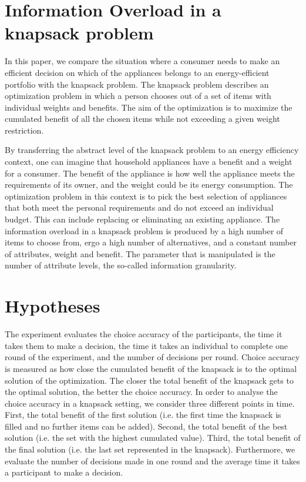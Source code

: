 \section{Information Overload in a knapsack problem}
\label{ch:Literature Review:sec:Information Overload in a knapsack problem}
In this paper, we compare the situation where a consumer needs to make an efficient decision on which of the appliances belongs to an energy-efficient portfolio with the knapsack problem. The knapsack problem describes an optimization problem in which a person chooses out of a set of items with individual weights and benefits. The aim of the optimization is to maximize the cumulated benefit of all the chosen items while not exceeding a given weight restriction.

By transferring the abstract level of the knapsack problem to an energy efficiency context, one can imagine that household appliances have a benefit and a weight for a consumer. The benefit of the appliance is how well the appliance meets the requirements of its owner, and the weight could be its energy consumption. The optimization problem in this context is to pick the best selection of appliances that both meet the personal requirements and do not exceed an individual budget. This can include replacing or eliminating an existing appliance.
The information overload in a knapsack problem is produced by a high number of items to choose from, ergo a high number of alternatives, and a constant number of attributes, weight and benefit. The parameter that is manipulated is the number of attribute levels, the so-called information granularity.

\section{Hypotheses}
\label{ch:Literature Review:sec:Hypotheses}
The experiment evaluates the choice accuracy of the participants, the time it takes them to make a decision, the time it takes an individual to complete one round of the experiment, and the number of decisions per round.
Choice accuracy is measured as how close the cumulated benefit of the knapsack is to the optimal solution of the optimization. The closer the total benefit of the knapsack gets to the optimal solution, the better the choice accuracy.
In order to analyse the choice accuracy in a knapsack setting, we consider three different points in time. First, the total benefit of the first solution (i.e. the first time the knapsack is filled and no further items can be added). Second, the total benefit of the best solution (i.e. the set with the highest cumulated value). Third, the total benefit of the final solution (i.e. the last set represented in the knapsack). Furthermore, we evaluate the number of decisions made in one round and the average time it takes a participant to make a decision.


